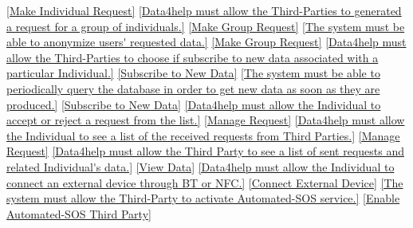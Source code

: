 \documentclass[a4paper]{article}
\begin{document}
\begin{traceabilitymatrix}
                {\ref{Make Individual Request}}
                {}
            \con{\ref{The Third-Party should be able to make group requests.}}
                {\ref{Data4help must allow the Third-Parties to generated a request for a group of individuals.}}
                {\ref{Make Group Request}}
                {}
            \con{\ref{The Third-Party should be able to make group requests.}}
                {\ref{The system must be able to anonymize users' requested data.}}
                {\ref{Make Group Request}}
                {}
            \con{\ref{The Third-Party should be able to subscribe to new data, once an Individual request is made.}}
                {\ref{Data4help must allow the Third-Parties to choose if subscribe to new data associated with a particular Individual.}}
                {\ref{Subscribe to New Data}}
                {}
            \con{\ref{The Third-Party should be able to subscribe to new data, once an Individual request is made.}}
                {\ref{The system must be able to periodically query the database in order to get new data as soon as they are produced.}}
                {\ref{Subscribe to New Data}}
                {}
                \con{\ref{The Individual should be able to accept or reject a request coming from a Third-Party.}}
                {\ref{Data4help must allow the Individual to accept or reject a request from the list.}}
                {\ref{Manage Request}}
                {}
                \con{\ref{The Individual should be able to accept or reject a request coming from a Third-Party.}}
                {\ref{Data4help must allow the Individual to see a list of the received requests from Third Parties.}}
                {\ref{Manage Request}}
                {}
                \con{\ref{The Third Party should be able to view Individual's data to whom has sent a request.}}
                {\ref{Data4help must allow the Third Party to see a list of sent requests and related Individual's data.}}
                {\ref{View Data}}
                {}
            \con{\ref{The Individual shall be able connect an external device to the system.}}
                {\ref{Data4help must allow the Individual to connect an external device through BT or NFC.}}
                {\ref{Connect External Device}}
                {}
            \con{\ref{The Third-Party shall be able to activate Automated-SOS service.}}
                {\ref{The system must allow the Third-Party to activate Automated-SOS service.}}
                {\ref{Enable Automated-SOS Third Party}}
                {}
                \con{\ref{The Third-Party shall be able to activate Automated-SOS service.}}

\end{traceabilitymatrix}
\end{document}
